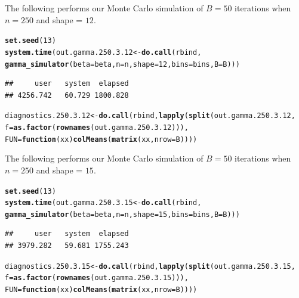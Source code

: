 \documentclass[11pt]{article}\usepackage[]{graphicx}\usepackage[]{color}
\makeatletter
\newcommand{\hlnum}[1]{\textcolor[rgb]{0.686,0.059,0.569}{#1}}%
\newcommand{\hlstd}[1]{\textcolor[rgb]{0.345,0.345,0.345}{#1}}%
\newcommand{\hlkwa}[1]{\textcolor[rgb]{0.161,0.373,0.58}{\textbf{#1}}}%
\newcommand{\hlkwb}[1]{\textcolor[rgb]{0.69,0.353,0.396}{#1}}%
\newcommand{\hlkwc}[1]{\textcolor[rgb]{0.333,0.667,0.333}{#1}}%
\newcommand{\hlkwd}[1]{\textcolor[rgb]{0.737,0.353,0.396}{\textbf{#1}}}%
\newenvironment{kframe}{%
 \def\at@end@of@kframe{}%
 \ifinner\ifhmode%
  \def\at@end@of@kframe{\end{minipage}}%
  \begin{minipage}{\columnwidth}%
 \fi\fi%
 \def\FrameCommand##1{\hskip\@totalleftmargin \hskip-\fboxsep
 \colorbox{shadecolor}{##1}\hskip-\fboxsep
     \hskip-\linewidth \hskip-\@totalleftmargin \hskip\columnwidth}%
 \MakeFramed {\advance\hsize-\width
   \@totalleftmargin\z@ \linewidth\hsize
   \@setminipage}}%
 {\par\unskip\endMakeFramed%
 \at@end@of@kframe}
\newenvironment{knitrout}{}{} %
\makeatother
\begin{document}
The following performs our Monte Carlo simulation of $B = 50$ iterations 
when $n = 250$ and shape = $12$.

\begin{knitrout}
\color{fgcolor}\begin{kframe}
\begin{alltt}
\hlkwd{set.seed}\hlstd{(}\hlnum{13}\hlstd{)}
\hlkwd{system.time}\hlstd{(out.gamma.250.3.12} \hlkwb{<-} \hlkwd{do.call}\hlstd{(rbind,}
  \hlkwd{gamma_simulator}\hlstd{(}\hlkwc{beta} \hlstd{= beta,} \hlkwc{n} \hlstd{= n,} \hlkwc{shape} \hlstd{=} \hlnum{12}\hlstd{,} \hlkwc{bins} \hlstd{= bins,} \hlkwc{B} \hlstd{= B)))}
\end{alltt}
\begin{verbatim}
##     user   system  elapsed 
## 4256.742   60.729 1800.828
\end{verbatim}
\begin{alltt}
\hlstd{diagnostics.250.3.12} \hlkwb{<-} \hlkwd{do.call}\hlstd{(rbind,} \hlkwd{lapply}\hlstd{(}\hlkwd{split}\hlstd{(out.gamma.250.3.12,}
  \hlkwc{f} \hlstd{=} \hlkwd{as.factor}\hlstd{(}\hlkwd{rownames}\hlstd{(out.gamma.250.3.12))),}
  \hlkwc{FUN} \hlstd{=} \hlkwa{function}\hlstd{(}\hlkwc{xx}\hlstd{)} \hlkwd{colMeans}\hlstd{(}\hlkwd{matrix}\hlstd{(xx,} \hlkwc{nrow} \hlstd{= B))))}
\end{alltt}
\end{kframe}
\end{knitrout}




The following performs our Monte Carlo simulation of $B = 50$ iterations 
when $n = 250$ and shape = $15$.

\begin{knitrout}
\color{fgcolor}\begin{kframe}
\begin{alltt}
\hlkwd{set.seed}\hlstd{(}\hlnum{13}\hlstd{)}
\hlkwd{system.time}\hlstd{(out.gamma.250.3.15} \hlkwb{<-} \hlkwd{do.call}\hlstd{(rbind,}
  \hlkwd{gamma_simulator}\hlstd{(}\hlkwc{beta} \hlstd{= beta,} \hlkwc{n} \hlstd{= n,} \hlkwc{shape} \hlstd{=} \hlnum{15}\hlstd{,} \hlkwc{bins} \hlstd{= bins,} \hlkwc{B} \hlstd{= B)))}
\end{alltt}
\begin{verbatim}
##     user   system  elapsed 
## 3979.282   59.681 1755.243
\end{verbatim}
\begin{alltt}
\hlstd{diagnostics.250.3.15} \hlkwb{<-} \hlkwd{do.call}\hlstd{(rbind,} \hlkwd{lapply}\hlstd{(}\hlkwd{split}\hlstd{(out.gamma.250.3.15,}
  \hlkwc{f} \hlstd{=} \hlkwd{as.factor}\hlstd{(}\hlkwd{rownames}\hlstd{(out.gamma.250.3.15))),}
  \hlkwc{FUN} \hlstd{=} \hlkwa{function}\hlstd{(}\hlkwc{xx}\hlstd{)} \hlkwd{colMeans}\hlstd{(}\hlkwd{matrix}\hlstd{(xx,} \hlkwc{nrow} \hlstd{= B))))}
\end{alltt}
\end{kframe}
\end{knitrout}
\end{document}
